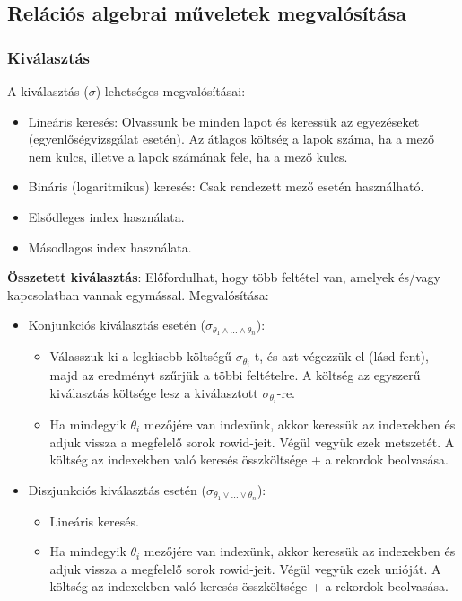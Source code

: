 \documentclass[margin=0px]{article}
\begin{document}
\subsection{Relációs algebrai műveletek megvalósítása}

\subsubsection{Kiválasztás}

A kiválasztás ($\sigma$) lehetséges megvalósításai:
\begin{itemize}
    \item	Lineáris keresés: Olvassunk be minden lapot és keressük az egyezéseket (egyenlőségvizsgálat esetén).
          Az átlagos költség a lapok száma, ha a mező nem kulcs, illetve a lapok számának fele, ha a mező kulcs.
    \item	Bináris (logaritmikus) keresés: Csak rendezett mező esetén használható.
    \item	Elsődleges index használata.
    \item	Másodlagos index használata.
\end{itemize}

\noindent \textbf{Összetett kiválasztás}: Előfordulhat, hogy több feltétel van, amelyek és/vagy kapcsolatban vannak egymással.
Megvalósítása:
\begin{itemize}
    \item	Konjunkciós kiválasztás esetén ($\sigma_{\theta_{1} \wedge ... \wedge \theta_{n}}$):
          \begin{itemize}
              \item	Válasszuk ki a legkisebb költségű $\sigma_{\theta_{i}}$-t, és azt végezzük el (lásd fent),
                    majd az eredményt szűrjük a többi feltételre. A költség az egyszerű kiválasztás költsége lesz a kiválasztott $\sigma_{\theta_{i}}$-re.

              \item	Ha mindegyik $\theta_{i}$ mezőjére van indexünk, akkor keressük az indexekben és adjuk vissza a megfelelő
                    sorok rowid-jeit. Végül vegyük ezek metszetét. A költség az indexekben való keresés összköltsége + a rekordok beolvasása.
          \end{itemize}

    \item	Diszjunkciós kiválasztás esetén ($\sigma_{\theta_{1} \vee ... \vee \theta_{n}}$):
          \begin{itemize}
              \item	Lineáris keresés.

              \item	Ha mindegyik $\theta_{i}$ mezőjére van indexünk, akkor keressük az indexekben és adjuk vissza a megfelelő
                    sorok rowid-jeit. Végül vegyük ezek unióját. A költség az indexekben való keresés összköltsége + a rekordok beolvasása.
          \end{itemize}
\end{itemize}
\end{document}
